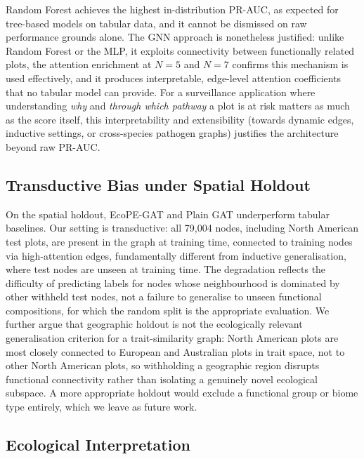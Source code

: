 \documentclass[a4paper,fleqn]{cas-sc}
\begin{document}
Random Forest achieves the highest in-distribution PR-AUC, as expected for tree-based models on tabular data, and it cannot be dismissed on raw performance grounds alone. The GNN approach is nonetheless justified: unlike Random Forest or the MLP, it exploits connectivity between functionally related plots, the attention enrichment at $N=5$ and $N=7$ confirms this mechanism is used effectively, and it produces interpretable, edge-level attention coefficients that no tabular model can provide. For a surveillance application where understanding \emph{why} and \emph{through which pathway} a plot is at risk matters as much as the score itself, this interpretability and extensibility (towards dynamic edges, inductive settings, or cross-species pathogen graphs) justifies the architecture beyond raw PR-AUC.

\subsection{Transductive Bias under Spatial Holdout}

On the spatial holdout, EcoPE-GAT and Plain GAT underperform tabular baselines. Our setting is transductive: all 79{,}004 nodes, including North American test plots, are present in the graph at training time, connected to training nodes via high-attention edges, fundamentally different from inductive generalisation, where test nodes are unseen at training time. The degradation reflects the difficulty of predicting labels for nodes whose neighbourhood is dominated by other withheld test nodes, not a failure to generalise to unseen functional compositions, for which the random split is the appropriate evaluation. We further argue that geographic holdout is not the ecologically relevant generalisation criterion for a trait-similarity graph: North American plots are most closely connected to European and Australian plots in trait space, not to other North American plots, so withholding a geographic region disrupts functional connectivity rather than isolating a genuinely novel ecological subspace. A more appropriate holdout would exclude a functional group or biome type entirely, which we leave as future work.

\subsection{Ecological Interpretation}
\end{document}
